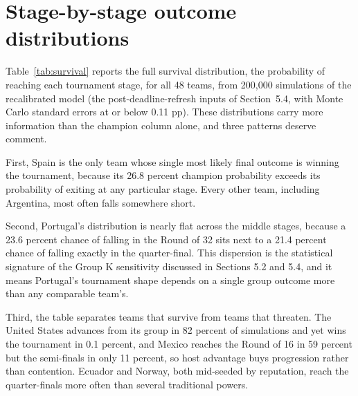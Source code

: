 \documentclass[11pt,letterpaper]{article}
\begin{document}
\section{Stage-by-stage outcome distributions}\label{app:survival}

Table~\ref{tab:survival} reports the full survival distribution, the probability of reaching each tournament stage, for all 48 teams, from 200{,}000 simulations of the recalibrated model (the post-deadline-refresh inputs of Section~5.4, with Monte Carlo standard errors at or below 0.11 pp). These distributions carry more information than the champion column alone, and three patterns deserve comment.

First, Spain is the only team whose single most likely final outcome is winning the tournament, because its 26.8 percent champion probability exceeds its probability of exiting at any particular stage. Every other team, including Argentina, most often falls somewhere short.

Second, Portugal's distribution is nearly flat across the middle stages, because a 23.6 percent chance of falling in the Round of 32 sits next to a 21.4 percent chance of falling exactly in the quarter-final. This dispersion is the statistical signature of the Group K sensitivity discussed in Sections 5.2 and 5.4, and it means Portugal's tournament shape depends on a single group outcome more than any comparable team's.

Third, the table separates teams that survive from teams that threaten. The United States advances from its group in 82 percent of simulations and yet wins the tournament in 0.1 percent, and Mexico reaches the Round of 16 in 59 percent but the semi-finals in only 11 percent, so host advantage buys progression rather than contention. Ecuador and Norway, both mid-seeded by reputation, reach the quarter-finals more often than several traditional powers.
\end{document}
